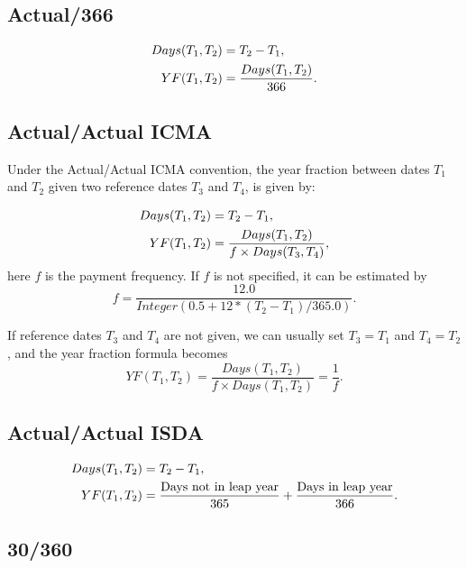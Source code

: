 \subsection{Actual/366}

\begin{align}
  Days(T_1,T_2) &= T_2 - T_1, \notag \\
  YF(T_1,T_2) &= \frac{Days(T_1,T_2)}{366}.
\end{align}


\subsection{Actual/Actual ICMA}
Under the Actual/Actual ICMA convention, the year fraction between dates $T_1$
and $T_2$ given two reference dates $T_3$ and $T_4$, is given by:

\begin{align}
  Days(T_1,T_2) &= T_2 - T_1, \notag \\
  YF(T_1,T_2) &= \frac{Days(T_1,T_2)}{f \times Days(T_3, T_4)},
\end{align}
here $f$ is the payment frequency. If $f$ is not specified, it can be estimated
by
\begin{equation}
  f = \frac{12.0}{Integer(0.5 + 12 * (T_2 - T_1) / 365.0)}.
\end{equation}

If reference dates $T_3$ and $T_4$ are not given, we can usually set $T_3=T_1$
and $T_4=T_2$, and the year fraction formula becomes
\begin{equation}
  YF(T_1,T_2) = \frac{Days(T_1,T_2)}{f \times Days(T_1, T_2)}
              = \frac{1}{f}.
\end{equation}


\subsection{Actual/Actual ISDA}

\begin{align}
  Days(T_1,T_2) &= T_2 - T_1, \notag \\
  YF(T_1,T_2) &= \frac{\text{Days not in leap year}}{365}
                 +\frac{\text{Days in leap year}}{366}.
\end{align}


\subsection{30/360}

